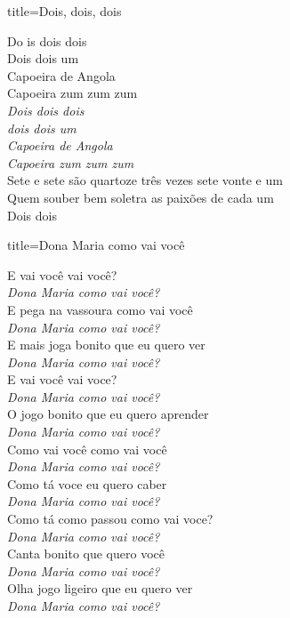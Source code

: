 \documentclass[fontsize=14pt, paper=a4, twoside, DIV=20]{scrreprt} %
\begin{document}
\begin{multicols*}{2}
\begin{song}{title={Dois, dois, dois}}
        \begin{verse*}
            Do is dois dois\\
            Dois dois um\\
            Capoeira de Angola\\
            Capoeira zum zum zum\\
            \textit{Dois dois dois}\\
            \textit{dois dois um}\\
            \textit{Capoeira de Angola}\\
            \textit{Capoeira zum zum zum}\\
            Sete e sete são quartoze três vezes sete vonte e um\\
            Quem souber bem soletra as paixões de cada um\\
            Dois dois\\
        \end{verse*}
\end{song}


\begin{song}{title={Dona Maria como vai você}}
        \begin{verse*}
            E vai você vai você?\\
            \textit{Dona Maria como vai você?}\\
            E pega na vassoura como vai você\\
            \textit{Dona Maria como vai você?}\\
            E mais joga bonito que eu quero ver\\
            \textit{Dona Maria como vai você?}\\
            E vai você vai voce?\\
            \textit{Dona Maria como vai você?}\\
            O jogo bonito que eu quero aprender\\
            \textit{Dona Maria como vai você?}\\
            Como vai você como vai você\\
            \textit{Dona Maria como vai você?}\\
            Como tá voce eu quero caber\\
            \textit{Dona Maria como vai você?}\\
            Como tá como passou como vai voce?\\
            \textit{Dona Maria como vai você?}\\
            Canta bonito que quero você\\
            \textit{Dona Maria como vai você?}\\
            Olha jogo ligeiro que eu quero ver\\
            \textit{Dona Maria como vai você?}\\
        \end{verse*}
\end{song}


\end{multicols*}
\end{document}
